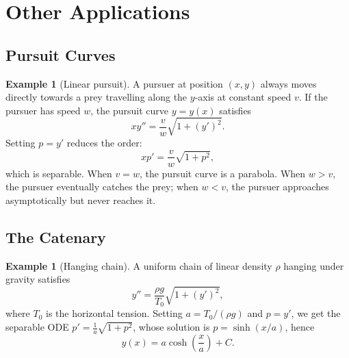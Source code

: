 \documentclass[12pt,a4paper,openany]{book}
\theoremstyle{definition}
\newtheorem{example}[definition]{Example}
\theoremstyle{plain}
\theoremstyle{remark}
\begin{document}
\section{Other Applications}
\label{sec:other-applications}

\subsection{Pursuit Curves}
\label{subsec:pursuit}

\begin{example}[Linear pursuit]
\label{ex:pursuit-curve}
A pursuer at position $(x,y)$ always moves directly towards a prey
travelling along the $y$-axis at constant speed $v$. If the pursuer
has speed $w$, the pursuit curve $y=y(x)$ satisfies
\[
  xy'' = \frac{v}{w}\sqrt{1+(y')^{2}}.
\]
Setting $p=y'$ reduces the order:
\[
  xp' = \frac{v}{w}\sqrt{1+p^{2}},
\]
which is separable. When $v=w$, the pursuit curve is a parabola.
When $w>v$, the pursuer eventually catches the prey; when $w<v$, the
pursuer approaches asymptotically but never reaches it.
\end{example}

\subsection{The Catenary}
\label{subsec:catenary}

\begin{example}[Hanging chain]
\label{ex:catenary}
A uniform chain of linear density $\rho$ hanging under gravity
satisfies
\[
  y'' = \frac{\rho g}{T_{0}}\sqrt{1+(y')^{2}},
\]
where $T_{0}$ is the horizontal tension. Setting $a=T_{0}/(\rho g)$
and $p=y'$, we get the separable ODE $p'=\frac{1}{a}\sqrt{1+p^{2}}$,
whose solution is $p=\sinh(x/a)$, hence
\[
  y(x) = a\cosh\!\left(\frac{x}{a}\right) + C.
\]
\end{example}

\begin{center}
\end{center}
\end{document}
